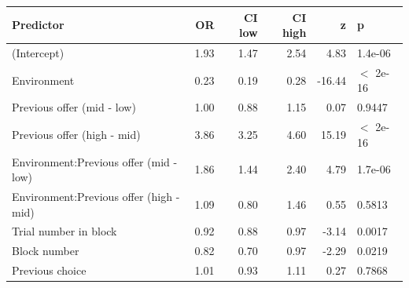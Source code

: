 \begin{table}[ht]
\centering
\begin{tabular}{lrrrrl}
  \hline
Predictor & OR & CI low & CI high & z & p \\ 
  \hline
(Intercept) & 1.93 & 1.47 & 2.54 & 4.83 & 1.4e-06 \\ 
  Environment & 0.23 & 0.19 & 0.28 & -16.44 & $<$ 2e-16 \\ 
  Previous offer (mid - low) & 1.00 & 0.88 & 1.15 & 0.07 & 0.9447 \\ 
  Previous offer (high - mid) & 3.86 & 3.25 & 4.60 & 15.19 & $<$ 2e-16 \\ 
  Environment:Previous offer (mid - low) & 1.86 & 1.44 & 2.40 & 4.79 & 1.7e-06 \\ 
  Environment:Previous offer (high - mid) & 1.09 & 0.80 & 1.46 & 0.55 & 0.5813 \\ 
  Trial number in block & 0.92 & 0.88 & 0.97 & -3.14 & 0.0017 \\ 
  Block number & 0.82 & 0.70 & 0.97 & -2.29 & 0.0219 \\ 
  Previous choice & 1.01 & 0.93 & 1.11 & 0.27 & 0.7868 \\ 
   \hline
\end{tabular}
\end{table}
